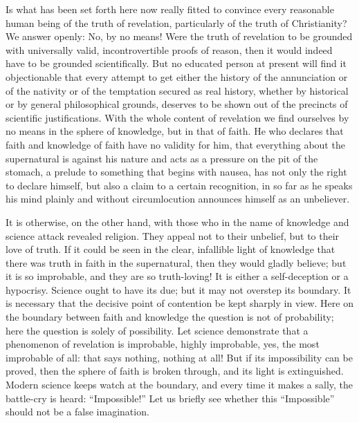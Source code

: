 \documentclass[12pt,a4paper,openany]{book}
\newcommand{\opage}[1]{\marginnote{\footnotesize\textit{[#1]}}}
\begin{document}
Is what has been set forth here now really fitted
to convince every reasonable human being of the truth of revelation,
particularly of the truth of Christianity?
We answer openly: No, by no means! Were the truth of revelation
to be grounded with universally valid, incontrovertible
proofs of reason, then it would indeed have to be grounded
scientifically. But no educated person at present will find
it objectionable that every attempt to get either
\setcounter{footnote}{0}%
\opage{66}the history of the annunciation or of the nativity or of the temptation
secured as real history, whether by historical or by general philosophical
grounds, deserves to be shown out of
the precincts of scientific justifications. With the whole content
of revelation we find ourselves by no means
in the sphere of knowledge, but in that of faith. He who declares that
faith and knowledge of faith have no validity for him,
that everything about the supernatural is against his nature and
acts as a pressure on the pit of the stomach, a prelude to something
that begins with nausea, has not only the right to
declare himself, but also a claim to a certain recognition,
in so far as he speaks his mind plainly
and without circumlocution announces himself as an unbeliever.

It is otherwise, on the other hand, with those
who in the name of knowledge and science attack revealed
religion. They appeal not to their unbelief,
but to their love of truth. If it could be seen in the
clear, infallible light of knowledge that there was
truth in faith in the supernatural, then they would
gladly believe; but it is so improbable, and they are so
truth-loving! It is either a self-deception or a
hypocrisy. Science ought to have its due; but it
may not overstep its boundary. It is necessary
that the decisive point of contention be kept sharply
in view. Here on the boundary between faith and knowledge
the question is not of probability; here the question is solely of
possibility. Let science demonstrate that a phenomenon of revelation is improbable, highly improbable,
yes, the most improbable of all: that says nothing, nothing at all!
But if its impossibility can be proved, then the sphere of faith
is broken through, and its light is extinguished. Modern
science keeps watch at the boundary, and every
\setcounter{footnote}{0}%
\opage{67}time it makes a sally, the battle-cry is heard: ``Impossible!''
Let us briefly see whether this ``Impossible'' should not
be a false imagination.
\end{document}
